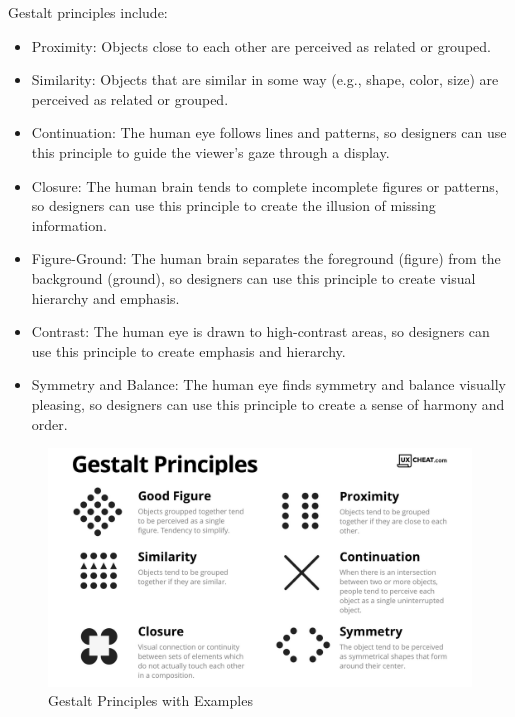 \documentclass[print]{nuthesis}
\providecommand{\tightlist}{%
  \setlength{\itemsep}{0pt}\setlength{\parskip}{0pt}}
\begin{document}

Gestalt principles include:

\begin{itemize}
\tightlist
\item
  Proximity: Objects close to each other are perceived as related or grouped.
\item
  Similarity: Objects that are similar in some way (e.g., shape, color, size) are perceived as related or grouped.
\item
  Continuation: The human eye follows lines and patterns, so designers can use this principle to guide the viewer's gaze through a display.
\item
  Closure: The human brain tends to complete incomplete figures or patterns, so designers can use this principle to create the illusion of missing information.
\item
  Figure-Ground: The human brain separates the foreground (figure) from the background (ground), so designers can use this principle to create visual hierarchy and emphasis.
\item
  Contrast: The human eye is drawn to high-contrast areas, so designers can use this principle to create emphasis and hierarchy.
\item
  Symmetry and Balance: The human eye finds symmetry and balance visually pleasing, so designers can use this principle to create a sense of harmony and order.
\end{itemize}

\begin{figure}

{\centering \includegraphics[width=0.75\linewidth]{figure/gestalt_principles} 

}

\caption{Gestalt Principles with Examples}\label{fig:gestalt}
\end{figure}
\end{document}
